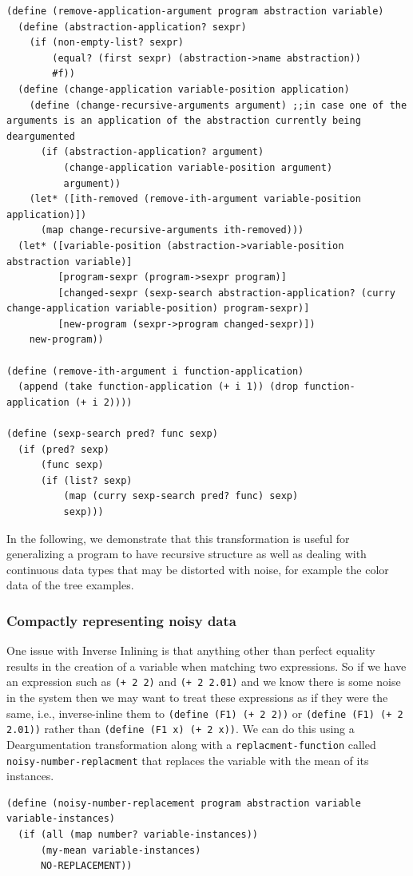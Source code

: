 \documentclass[a4paper,10pt]{article}
\begin{document}
\begin{lstlisting}[frame=trBL]
(define (remove-application-argument program abstraction variable)
  (define (abstraction-application? sexpr)
    (if (non-empty-list? sexpr)
        (equal? (first sexpr) (abstraction->name abstraction))
        #f))
  (define (change-application variable-position application)
    (define (change-recursive-arguments argument) ;;in case one of the arguments is an application of the abstraction currently being deargumented
      (if (abstraction-application? argument)
          (change-application variable-position argument)
          argument))
    (let* ([ith-removed (remove-ith-argument variable-position application)])
      (map change-recursive-arguments ith-removed)))
  (let* ([variable-position (abstraction->variable-position abstraction variable)]
         [program-sexpr (program->sexpr program)]
         [changed-sexpr (sexp-search abstraction-application? (curry change-application variable-position) program-sexpr)]
         [new-program (sexpr->program changed-sexpr)])
    new-program))

(define (remove-ith-argument i function-application)
  (append (take function-application (+ i 1)) (drop function-application (+ i 2))))

(define (sexp-search pred? func sexp)
  (if (pred? sexp)
      (func sexp)
      (if (list? sexp)
          (map (curry sexp-search pred? func) sexp)
          sexp)))
\end{lstlisting}
In the following, we demonstrate that this transformation is useful for generalizing a program to have recursive structure as well as dealing with continuous data types that may be distorted with noise, for example the color data of the tree examples.

\subsubsection{Compactly representing noisy data}
One issue with Inverse Inlining is that anything other than perfect equality results in the creation of a variable when matching two expressions.  So if we have an expression such as \texttt{(+ 2 2)} and \texttt{(+ 2 2.01)} and we know there is some noise in the system then we may want to treat these expressions as if they were the same, i.e., inverse-inline them to \texttt{(define (F1) (+ 2 2))} or \texttt{(define (F1) (+ 2 2.01))} rather than \texttt{(define (F1 x) (+ 2 x))}.  We can do this using a Deargumentation transformation along with a \texttt{replacment-function} called \texttt{noisy-number-replacment} that replaces the variable with the mean of its instances.  
\begin{lstlisting}[frame=trBL]
(define (noisy-number-replacement program abstraction variable variable-instances)
  (if (all (map number? variable-instances))
      (my-mean variable-instances)
      NO-REPLACEMENT))
\end{lstlisting}
\end{document}
